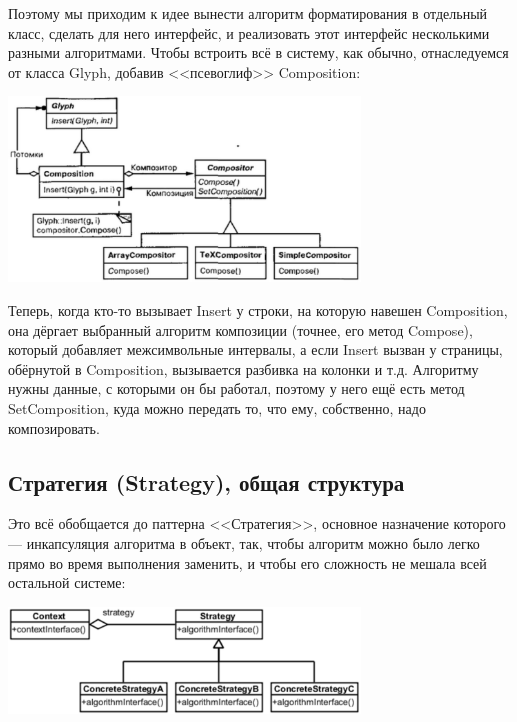 \documentclass{../text-style}
\begin{document}
Поэтому мы приходим к идее вынести алгоритм форматирования в отдельный класс, сделать для него интерфейс, и реализовать этот интерфейс несколькими разными алгоритмами. Чтобы встроить всё в систему, как обычно, отнаследуемся от класса Glyph, добавив <<псевоглиф>> Composition:

\begin{center}
    \includegraphics[width=0.7\textwidth]{compositor.png}
\end{center}

Теперь, когда кто-то вызывает Insert у строки, на которую навешен Composition, она дёргает выбранный алгоритм композиции (точнее, его метод Compose), который добавляет межсимвольные интервалы, а если Insert вызван у страницы, обёрнутой в Composition, вызывается разбивка на колонки и т.д. Алгоритму нужны данные, с которыми он бы работал, поэтому у него ещё есть метод SetComposition, куда можно передать то, что ему, собственно, надо композировать.

\subsection{Стратегия (Strategy), общая структура}

Это всё обобщается до паттерна <<Стратегия>>, основное назначение которого --- инкапсуляция алгоритма в объект, так, чтобы алгоритм можно было легко прямо во время выполнения заменить, и чтобы его сложность не мешала всей остальной системе:

\begin{center}
    \includegraphics[width=0.7\textwidth]{strategy.png}
\end{center}
\end{document}

